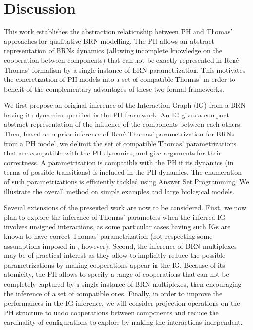\section{Discussion}

This work establishes the abstraction relationship between PH and Thomas' approaches for
qualitative BRN modelling.
The PH allows an abstract representation of BRNs dynamics (allowing incomplete knowledge on the
cooperation between components) that can not be exactly represented in Ren\'e Thomas' formalism by a
single instance of BRN parametrization.
This motivates the concretization of PH models into a set of compatible Thomas' in order to benefit
of the complementary advantages of these two formal frameworks.

We first propose an original inference of the Interaction Graph (IG) from a BRN
having its dynamics specified in the PH framework.
An IG gives a compact abstract representation of the influence of the components between each
others.
Then, based on a prior inference of Ren\'e Thomas' parametrization for BRNs from a PH model, we
delimit the set of compatible Thomas' parametrizations that are compatible with the PH dynamics,
and give arguments for their correctness.
A parametrization is compatible with the PH if its dynamics (in terms of possible transitions) is included in the PH dynamics.
The enumeration of such parametrizations is efficiently tackled using Answer Set Programming.
We illustrate the overall method on simple examples and large biological models.

Several extensions of the presented work are now to be considered.
First, we now plan to explore the inference of Thomas' parameters when the inferred IG involves unsigned interactions, as some particular cases having such IGs are known to have correct
Thomas' parametrization (not respecting some assumptions imposed in ,
however).
Second, the inference of BRN multiplexes \cite{BernotMultiplexes} may be of practical interest 
as they allow to implicitly reduce the possible parametrizations by making cooperations appear
in the IG.
Because of its atomicity, the PH allows to specify a range of cooperations that can not be
completely captured by a single instance of BRN multiplexes, then encouraging the inference of a set
of compatible ones.
Finally, in order to improve the performances in the IG inference, we will consider projection operations on
the PH structure to undo cooperations between components and reduce the cardinality of
configurations to explore by making the interactions independent.

